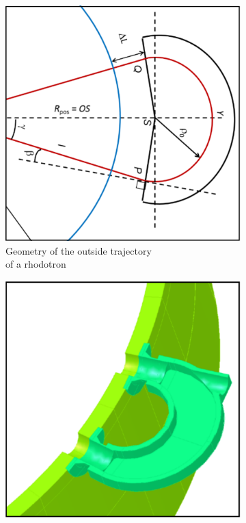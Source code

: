 \documentclass[a4paper,oneside,12pt]{report}
\numberwithin{equation}{chapter}
\begin{document}
\begin{figure}[H]
    \captionsetup[subfigure]{justification=centering}
    \captionsetup{justification=centering}
    \centering
    \begin{subfigure}{.5\textwidth}
      \centering
      \includegraphics[width=.9\linewidth]{./figures/design/Ltot.png}
      \caption{Geometry of the outside trajectory \\ of a rhodotron \cite{cite:rhodo_design}}
    \end{subfigure}%
    \centering
    \begin{subfigure}{.5\textwidth}
      \centering
      \includegraphics[width=.9\linewidth]{./figures/design/tt300_mag.png}

\end{subfigure}
\end{figure}
\end{document}
